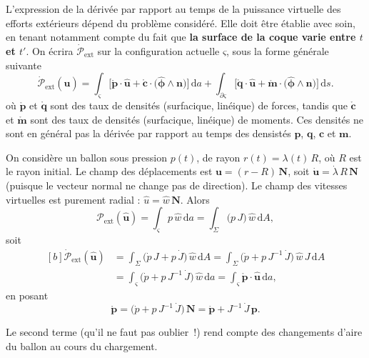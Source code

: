 \documentclass[
  a4paper,
  DIV=11,
  numbers=noendperiod]{scrreprt}
\newcommand{\D}{{\mathrm d}}
\newcommand{\external}{\mathrm{ext}}
\newcommand{\power}{\mathcal{P}}
\renewcommand{\vec}[1]{\symbf{#1}}
\begin{document}
L'expression de la dérivée par rapport au temps de la puissance
virtuelle des efforts extérieurs dépend du problème considéré. Elle doit
être établie avec soin, en tenant notamment compte du fait que
\textbf{la surface de la coque varie entre \(t\) et \(t'\)}. On écrira
\(\dot{\power}_\external\) sur la configuration actuelle \(ς\), sous la
forme générale suivante \[
\dot{\mathcal{P}}_\external(\hat{\vec{u}})=
∫_ς \bigl[ \mathring{\vec{p}} ⋅ \hat{\vec{u}} + \mathring{\vec{c}} ⋅ \bigl( \hat{\vec{ϕ}} \wedge \vec{n} \bigr) \bigr] \, \D a
+ ∫_{∂ς} \bigl[ \mathring{\vec{q}} ⋅ \hat{\vec{u}} + \mathring{\vec{m}} ⋅ \bigl( \hat{\vec{ϕ}} \wedge \vec{n} \bigr) \bigr] \, \D s.
\] où \(\mathring{\vec{p}}\) et \(\mathring{\vec{q}}\) sont des taux de
densités (surfacique, linéique) de forces, tandis que
\(\mathring{\vec{c}}\) et \(\mathring{\vec{m}}\) sont des taux de
densités (surfacique, linéique) de moments. Ces densités ne sont en
général pas la dérivée par rapport au temps des densistés \(\vec{p}\),
\(\vec{q}\), \(\vec{c}\) et \(\vec{m}\).

\begin{tcolorbox}[enhanced jigsaw, toptitle=1mm, title=\textcolor{quarto-callout-note-color}{\faInfo}\hspace{0.5em}{Exemple: ballon sphérique sous pression}, colbacktitle=quarto-callout-note-color!10!white, toprule=.15mm, left=2mm, bottomrule=.15mm, arc=.35mm, breakable, opacityback=0, colframe=quarto-callout-note-color-frame, bottomtitle=1mm, titlerule=0mm, leftrule=.75mm, opacitybacktitle=0.6, coltitle=black, rightrule=.15mm, colback=white]

On considère un ballon sous pression \(p(t)\), de rayon
\(r(t) = λ(t) \, R\), où \(R\) est le rayon initial. Le champ des
déplacements est \(\vec{u} = (r - R) \, \vec{N}\), soit
\(\dot{\vec{u}} = \dot{λ} \, R \, \vec{N}\) (puisque le vecteur normal
ne change pas de direction). Le champ des vitesses virtuelles est
purement radial : \(\hat{u} = \hat{w} \, \vec{N}\). Alors \[
\power_\external(\hat{\vec{u}}) = ∫_ς p \, \hat{w} \, \D a = ∫_Σ \bigl( p \, J \bigr) \, \hat{w} \, \D A,
\] soit \[
\begin{aligned}[b]
\dot{\power}_\external(\hat{\vec{u}}) &= ∫_Σ \bigl( \dot{p} \, J + p \, \dot{J} \bigr) \, \hat{w} \, \D A = ∫_Σ \bigl(\dot{p} + p \, J^{-1} \, \dot{J} \bigr) \, \hat{w} \, J \, \D A\\
&= ∫_ς \bigl(\dot{p} + p \, J^{-1} \, \dot{J} \bigr) \, \hat{w} \, \D a = ∫_ς \mathring{\vec{p}} ⋅ \hat{\vec{u}} \, \D a,
\end{aligned}
\] en posant \[
\mathring{\vec{p}} = \bigl(\dot{p} + p \, J^{-1} \, \dot{J} \bigr) \, \vec{N} = \dot{\vec{p}} + J^{-1} \, \dot{J} \, \vec{p}.
\]

Le second terme (qu'il ne faut pas oublier~!) rend compte des
changements d'aire du ballon au cours du chargement.

\end{tcolorbox}
\end{document}
